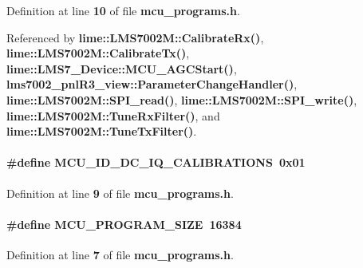Definition at line {\bf 10} of file {\bf mcu\+\_\+programs.\+h}.



Referenced by {\bf lime\+::\+L\+M\+S7002\+M\+::\+Calibrate\+Rx()}, {\bf lime\+::\+L\+M\+S7002\+M\+::\+Calibrate\+Tx()}, {\bf lime\+::\+L\+M\+S7\+\_\+\+Device\+::\+M\+C\+U\+\_\+\+A\+G\+C\+Start()}, {\bf lms7002\+\_\+pnl\+R3\+\_\+view\+::\+Parameter\+Change\+Handler()}, {\bf lime\+::\+L\+M\+S7002\+M\+::\+S\+P\+I\+\_\+read()}, {\bf lime\+::\+L\+M\+S7002\+M\+::\+S\+P\+I\+\_\+write()}, {\bf lime\+::\+L\+M\+S7002\+M\+::\+Tune\+Rx\+Filter()}, and {\bf lime\+::\+L\+M\+S7002\+M\+::\+Tune\+Tx\+Filter()}.

\paragraph[{M\+C\+U\+\_\+\+I\+D\+\_\+\+D\+C\+\_\+\+I\+Q\+\_\+\+C\+A\+L\+I\+B\+R\+A\+T\+I\+O\+NS}]{\setlength{\rightskip}{0pt plus 5cm}\#define M\+C\+U\+\_\+\+I\+D\+\_\+\+D\+C\+\_\+\+I\+Q\+\_\+\+C\+A\+L\+I\+B\+R\+A\+T\+I\+O\+NS~0x01}\label{mcu__programs_8h_a876355648106d19b65a45e50f2a323ea}


Definition at line {\bf 9} of file {\bf mcu\+\_\+programs.\+h}.

\paragraph[{M\+C\+U\+\_\+\+P\+R\+O\+G\+R\+A\+M\+\_\+\+S\+I\+ZE}]{\setlength{\rightskip}{0pt plus 5cm}\#define M\+C\+U\+\_\+\+P\+R\+O\+G\+R\+A\+M\+\_\+\+S\+I\+ZE~16384}\label{mcu__programs_8h_ad0251a35ecf65a94c07abf9de71d5dc1}


Definition at line {\bf 7} of file {\bf mcu\+\_\+programs.\+h}.



